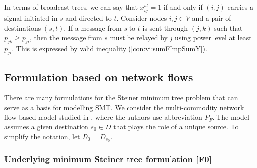 In terms of broadcast trees, we can say that $x_{ij}^{st}=1$ if and only if $(i,j)$ carries a signal initiated in $s$ and directed to $t$.
Consider nodes $i,j\in V$ and a pair of destinations $(s,t)$.
If a message from $s$ to $t$ is sent through $(j,k)$ such that $p_{jk}\geq p_{ji}$, then the message from $s$ must be relayed by $j$ using power level at least $p_{ji}$.
This is expressed by valid inequality (\ref{con:vi:sumFImpSumY}).

\subsection{Formulation based on network flows}

There are many formulations for the Steiner minimum tree problem that can serve as a basis for modelling SMT.
We consider the multi-commodity network flow based model studied in \cite{Polzin}, where the authors use abbreviation $P_{F}$.
The model assumes a given destination $s_0\in D$ that plays the role of a unique source.
To simplify the notation, let $D_0= D_{s_0}$.

\subsubsection{Underlying minimum Steiner tree formulation [F0]}

